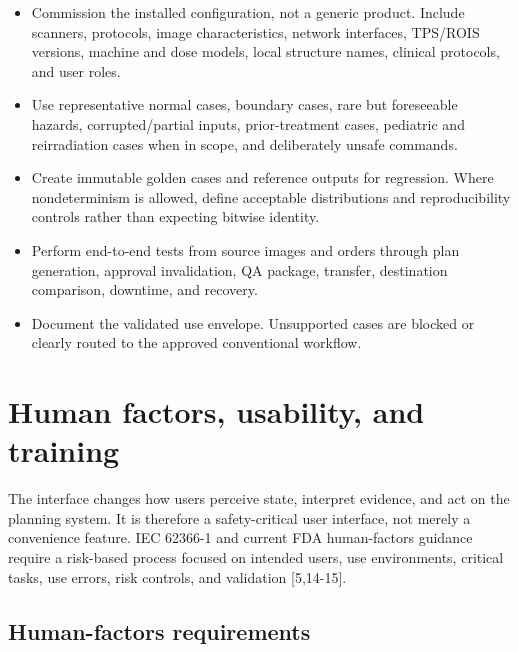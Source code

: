 \documentclass[11pt,letterpaper]{article}
\begin{document}
\begin{itemize}
\item Commission the installed configuration, not a generic product. Include scanners, protocols, image characteristics, network interfaces, TPS\slash\allowbreak{}ROIS versions, machine and dose models, local structure names, clinical protocols, and user roles.
\item Use representative normal cases, boundary cases, rare but foreseeable hazards, corrupted\slash\allowbreak{}partial inputs, prior-treatment cases, pediatric and reirradiation cases when in scope, and deliberately unsafe commands.
\item Create immutable golden cases and reference outputs for regression. Where nondeterminism is allowed, define acceptable distributions and reproducibility controls rather than expecting bitwise identity.
\item Perform end-to-end tests from source images and orders through plan generation, approval invalidation, QA package, transfer, destination comparison, downtime, and recovery.
\item Document the validated use envelope. Unsupported cases are blocked or clearly routed to the approved conventional workflow.
\end{itemize}

\section{Human factors, usability, and training}

The interface changes how users perceive state, interpret evidence, and act on the planning system. It is therefore a safety-critical user interface, not merely a convenience feature. IEC 62366-1 and current FDA human-factors guidance require a risk-based process focused on intended users, use environments, critical tasks, use errors, risk controls, and validation [5,14-15].

\subsection{Human-factors requirements}
\end{document}
